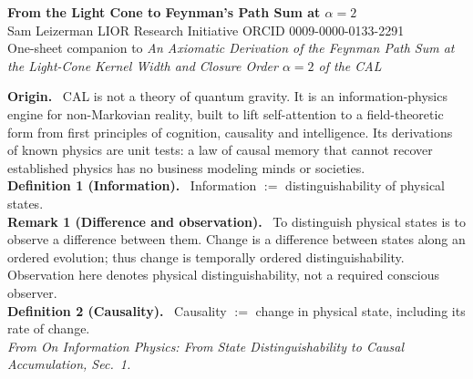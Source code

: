 \documentclass[9pt]{extarticle}
\begin{document}
\begin{center}
{\Large\bfseries\color{ink} From the Light Cone to Feynman's Path Sum at $\alpha=2$}\\[2pt]
{\small Sam Leizerman \;\textbullet\; LIOR Research Initiative \;\textbullet\; ORCID 0009-0000-0133-2291}\\[1pt]
{\small\color{note} One-sheet companion to \textit{An Axiomatic Derivation of the Feynman Path Sum at the Light-Cone Kernel Width and Closure Order $\alpha=2$ of the CAL}}
\end{center}
\vspace{-4pt}

\begin{tcolorbox}[colback=ink!4,colframe=ink!60,boxrule=0.5pt,left=5pt,right=5pt,top=3pt,bottom=3pt]
\small
\textbf{Origin.} \ CAL is not a theory of quantum gravity. It is an information-physics engine for non-Markovian reality, built to lift self-attention to a field-theoretic form from first principles of cognition, causality and intelligence. Its derivations of known physics are unit tests: a law of causal memory that cannot recover established physics has no business modeling minds or societies.\\[2pt]
\textbf{Definition 1 (Information).} \ Information $:=$ distinguishability of physical states.\\[2pt]
\textbf{Remark 1 (Difference and observation).} \ To distinguish physical states is to observe a difference between them. Change is a difference between states along an ordered evolution; thus change is temporally ordered distinguishability. Observation here denotes physical distinguishability, not a required conscious observer.\\[2pt]
\textbf{Definition 2 (Causality).} \ Causality $:=$ change in physical state, including its rate of change.\\[1pt]
{\color{note}\footnotesize\textit{From On Information Physics: From State Distinguishability to Causal Accumulation, Sec.~1.}}
\end{tcolorbox}
\end{document}
